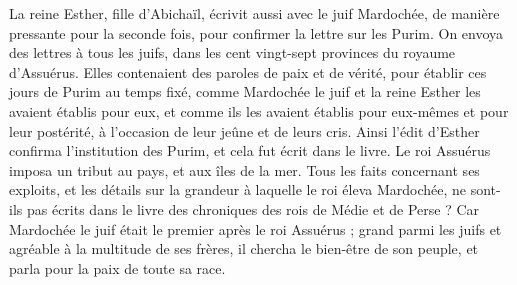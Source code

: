 \begin{multicols}{2}
La reine Esther, fille d'Abichaïl, écrivit aussi avec le juif Mardochée, de manière pressante pour la seconde fois, pour confirmer la lettre sur les Purim.
On envoya des lettres à tous les juifs, dans les cent vingt-sept provinces du royaume d'Assuérus. Elles contenaient des paroles de paix et de vérité,
pour établir ces jours de Purim au temps fixé, comme Mardochée le juif et la reine Esther les avaient établis pour eux, et comme ils les avaient établis pour eux-mêmes et pour leur postérité, à l’occasion de leur jeûne et de leurs cris.
Ainsi l'édit d'Esther confirma l’institution des Purim, et cela fut écrit dans le livre.
\VerseOne{}Le roi Assuérus imposa un tribut au pays, et aux îles de la mer.
Tous les faits concernant ses exploits, et les détails sur la grandeur à laquelle le roi éleva Mardochée, ne sont-ils pas écrits dans le livre des chroniques des rois de Médie et de Perse ?
Car Mardochée le juif était le premier après le roi Assuérus ; grand parmi les juifs et agréable à la multitude de ses frères, il chercha le bien-être de son peuple, et parla pour la paix de toute sa race.
\PPE{}
\end{multicols}
